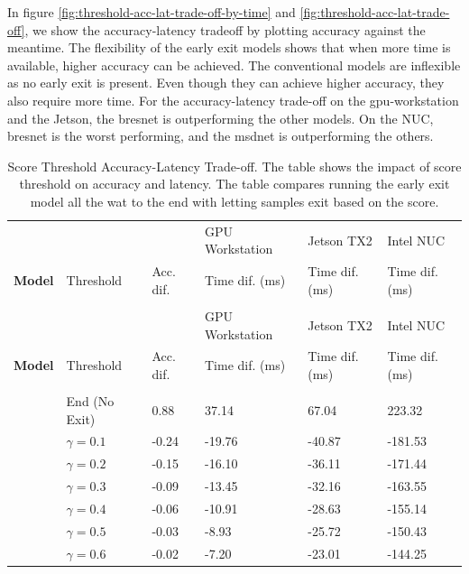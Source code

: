 In figure \ref{fig:threshold-acc-lat-trade-off-by-time} and \ref{fig:threshold-acc-lat-trade-off}, we show the accuracy-latency tradeoff by plotting accuracy against the meantime.
The flexibility of the early exit models shows that when more time is available, higher accuracy can be achieved. The conventional models are inflexible as no early exit is present. Even though they can achieve higher accuracy, they also require more time.
For the accuracy-latency trade-off on the \gls{gpu}-workstation and the Jetson, the \gls{bresnet} is outperforming the other models. On the NUC, \gls{bresnet} is the worst performing, and the \gls{msdnet} is outperforming the others. 

	\begin{scriptsize}
		
		\begin{longtabu}{>{\bfseries}X|X|X[r]|X[r]|X[r]|X[r]}
			\caption[Score Threshold Accuracy-Latency Trade-off]{Score Threshold Accuracy-Latency Trade-off. The table shows the impact of score threshold on accuracy and latency. The table compares running the early exit model all the wat to the end with letting samples exit based on the score.}\label{tbl:score-acc-lat-trade} \\
			\toprule
			\rowfont{\bfseries}
			& & & {GPU Workstation} &  {Jetson TX2} & {Intel NUC} \tabularnewline
			\rowfont{\bfseries} Model & Threshold & Acc. dif. & Time dif. (ms)  & Time dif. (ms) & Time dif. (ms) \tabularnewline
			\hline
			\endfirsthead
			\\
			\toprule
			\rowfont{\bfseries}
			& &  & {GPU Workstation} &  {Jetson TX2} & {Intel NUC} \tabularnewline
			\rowfont{\bfseries} Model & Threshold & Acc. dif. & Time dif. (ms)  & Time dif. (ms) & Time dif. (ms) \tabularnewline
			\hline
			\endhead %
			\hline
			\\
			\endfoot
			\hline
			 & End (No Exit) & 0.88 & 37.14 & 67.04 & 223.32  \tabularnewline {}
			& $ \gamma = 0.1 $ 	& -0.24 & -19.76 & -40.87 & -181.53 \tabularnewline
			&$ \gamma = 0.2 $ 	& -0.15 & -16.10 & -36.11 & -171.44 \tabularnewline 
			&$ \gamma = 0.3 $ 	& -0.09 & -13.45 & -32.16 & -163.55 \tabularnewline
			&$ \gamma = 0.4 $ 	& -0.06 & -10.91 & -28.63 & -155.14 \tabularnewline 
			&$ \gamma = 0.5 $ 	& -0.03 &  -8.93 & -25.72 & -150.43 \tabularnewline
			&$ \gamma = 0.6 $ 	& -0.02 &  -7.20 & -23.01 & -144.25 \tabularnewline 

\end{longtabu}
\end{scriptsize}
